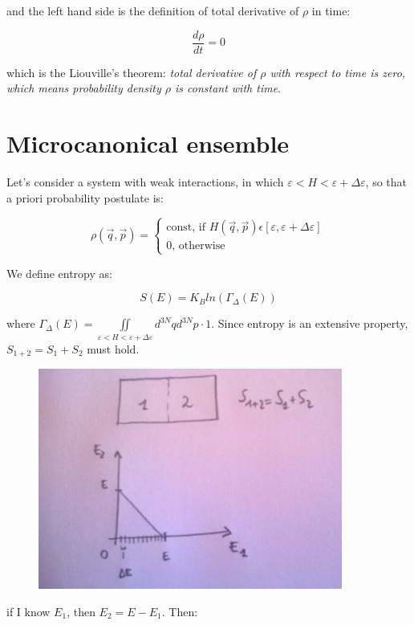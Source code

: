 \documentclass[a4paper, italian, openany]{book}
\begin{document}
and the left hand side is the definition of total derivative of $\rho$ in time:

$$\frac{d\rho}{dt} = 0$$

which is the Liouville's theorem: \textit{total derivative of $\rho$ with respect to time is zero, which means probability density $\rho$ is constant with time}.

\section{Microcanonical ensemble}

Let's consider a system with weak interactions, in which $\varepsilon < H < \varepsilon + \Delta \varepsilon$, so that a priori probability postulate is:

$$\rho(\overrightarrow{q}, \overrightarrow{p}) = \begin{cases}\mbox{const} \mbox{,   if   } H(\overrightarrow{q}, \overrightarrow{p}) \epsilon \left [ \varepsilon , \varepsilon + \Delta \varepsilon \right ] \\ 0 \mbox{,   otherwise}\end{cases}$$

We define entropy as:

$$S(E) = K_B ln(\Gamma_\Delta(E))$$

where $\Gamma_\Delta(E) = \iint \limits_{\varepsilon < H < \varepsilon + \Delta \varepsilon} d^{3N}q d^{3N}p \cdot 1$.\newline 
Since entropy is an extensive property,  $S_{1+2} = S_1 + S_2$ must hold.

\begin{figure}[H]
\centering
\includegraphics[width=100mm]{img/figure4.jpg}
\end{figure}

if I know $E_1$, then $E_2 = E- E_1$. Then:
\end{document}
